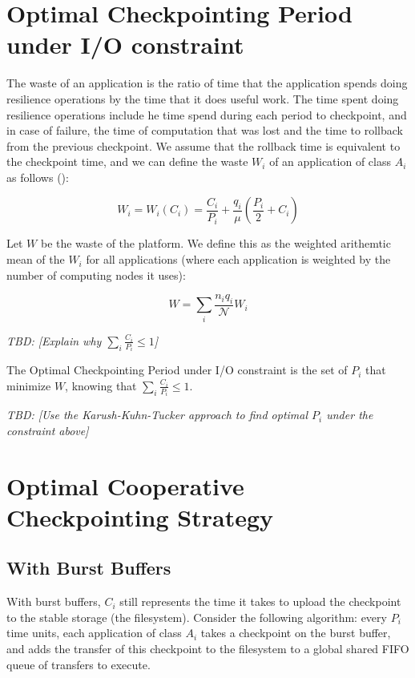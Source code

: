 \documentclass{article}
\newcommand{\nbnodesplat}{{\mathcal N}}
\newcommand{\app}[1]{A_{#1}}
\newcommand{\nbapp}[1]{n_{#1}}
\newcommand{\nbnodes}[1]{q_{#1}}
\newcommand{\period}[1]{P_{#1}}
\newcommand{\ckpt}[1]{C_{#1}}
\newcommand{\wasteapp}[1]{W_{#1}}
\newcommand{\mtbfplat}{\mu}
\newcommand{\wasteplat}{W}
\newcommand{\wastefct}[2]{W_{#1}(#2)}
\newcommand{\todo}[1]{\textit{TBD: [#1]}}
\begin{document}
\section{Optimal Checkpointing Period under I/O constraint}
\label{sec.optimal}

The waste of an application is the ratio of time that the application spends doing
resilience operations by the time that it does useful work. The time
spent doing resilience operations include he time spend during each period to
checkpoint, and in case of failure, the time of computation that was
lost and the time to rollback from the previous checkpoint. We assume
that the rollback time is equivalent to the checkpoint time, and we
can define the waste $\wasteapp{i}$ of an application of class
$\app{i}$ as follows (\cite{springer-monograph}):

$$\wasteapp{i} = \wastefct{i}{\ckpt{i}} = \frac{\ckpt{i}}{\period{i}} +
\frac{\nbnodes{i}}{\mtbfplat}(\frac{\period{i}}{2} + \ckpt{i})$$

Let $\wasteplat$ be the waste of the platform. We define this as the
weighted arithemtic mean of the $\wasteapp{i}$ for all applications
(where each application is weighted by the number of computing nodes
it uses):

$$\wasteplat = \sum_i \frac{\nbapp{i} \nbnodes{i}}{\nbnodesplat} \wasteapp{i}$$

\todo{Explain why $\sum_i \frac{\ckpt{i}}{\period{i}}\leq 1$}

The Optimal Checkpointing Period under I/O constraint is the set of
$\period{i}$ that minimize $\wasteplat$, knowing that $\sum_i
\frac{\ckpt{i}}{\period{i}} \leq 1$.

\todo{Use the Karush-Kuhn-Tucker approach to find optimal
  $\period{i}$ under the constraint above}

\section{Optimal Cooperative Checkpointing Strategy}
\label{sec.strategy}

\subsection{With Burst Buffers}

With burst buffers, $\ckpt{i}$ still represents the time it takes to
upload the checkpoint to the stable storage (the filesystem).
Consider the following algorithm: every $\period{i}$ time units, each
application of class $\app{i}$ takes a checkpoint on the burst buffer,
and adds the transfer of this checkpoint to the filesystem to a global
shared FIFO queue of transfers to execute.
\end{document}
